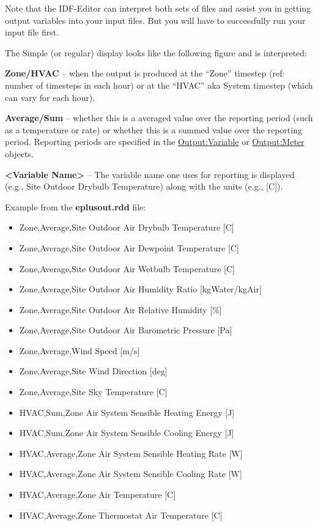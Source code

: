 Note that the IDF-Editor can interpret both sets of files and assist you in getting output variables into your input files. But you will have to successfully run your input file first.

The Simple (or regular) display looks like the following figure and is interpreted:

\textbf{Zone/HVAC} -- when the output is produced at the ``Zone'' timestep (ref: number of timesteps in each hour) or at the ``HVAC'' aka System timestep (which can vary for each hour).

\textbf{Average/Sum} -- whether this is a averaged value over the reporting period (such as a temperature or rate) or whether this is a summed value over the reporting period. Reporting periods are specified in the \hyperref[outputvariable]{Output:Variable} or \hyperref[outputmeter-and-outputmetermeterfileonly]{Output:Meter} objects.

\textbf{\textless{}Variable Name\textgreater{}} -- The variable name one uses for reporting is displayed (e.g., Site Outdoor Drybulb Temperature) along with the units (e.g., {[}C{]}).

Example from the \textbf{eplusout.rdd} file:

\begin{itemize}
\item
  Zone,Average,Site Outdoor Air Drybulb Temperature {[}C{]}
\item
  Zone,Average,Site Outdoor Air Dewpoint Temperature {[}C{]}
\item
  Zone,Average,Site Outdoor Air Wetbulb Temperature {[}C{]}
\item
  Zone,Average,Site Outdoor Air Humidity Ratio {[}kgWater/kgAir{]}
\item
  Zone,Average,Site Outdoor Air Relative Humidity {[}\%{]}
\item
  Zone,Average,Site Outdoor Air Barometric Pressure {[}Pa{]}
\item
  Zone,Average,Wind Speed {[}m/s{]}
\item
  Zone,Average,Site Wind Direction {[}deg{]}
\item
  Zone,Average,Site Sky Temperature {[}C{]}
\item
  HVAC,Sum,Zone Air System Sensible Heating Energy {[}J{]}
\item
  HVAC,Sum,Zone Air System Sensible Cooling Energy {[}J{]}
\item
  HVAC,Average,Zone Air System Sensible Heating Rate {[}W{]}
\item
  HVAC,Average,Zone Air System Sensible Cooling Rate {[}W{]}
\item
  HVAC,Average,Zone Air Temperature {[}C{]}
\item
  HVAC,Average,Zone Thermostat Air Temperature {[}C{]}
\end{itemize}

